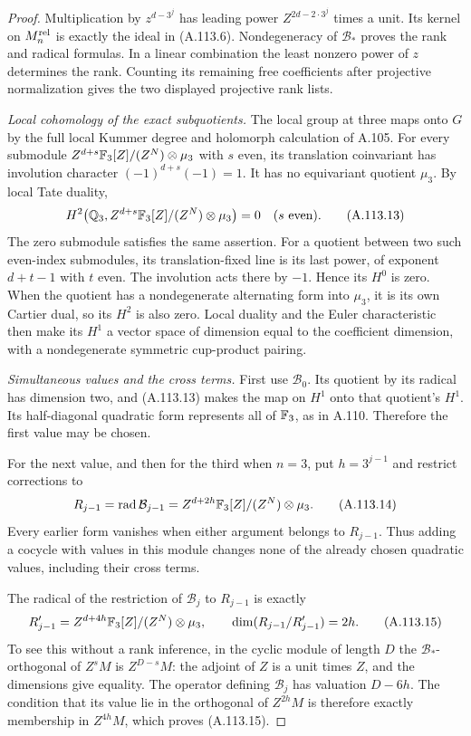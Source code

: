 \begin{proof}
Multiplication by $z^{d-3^j}$ has leading power
$Z^{2d-2\cdot3^j}$ times a unit.
Its kernel on $M_n^{\rm rel}$ is exactly the ideal in
(A.113.6).  Nondegeneracy of $\mathcal B_*$ proves the
rank and radical formulas.  In a linear combination the
least nonzero power of $z$ determines the rank.
Counting its remaining free coefficients after projective
normalization gives the two displayed projective rank lists.

\emph{Local cohomology of the exact subquotients.}
The local group at three maps onto $G$ by the full local
Kummer degree and holomorph calculation of A.105.
For every submodule $Z^{d+s}\mathbb F_3[Z]/(Z^N)\otimes\mu_3$
with $s$ even, its translation coinvariant has involution
character $(-1)^{d+s}(-1)=1$.
It has no equivariant quotient $\mu_3$.
By local Tate duality,
\[
 H^2\bigl(\mathbb Q_3,Z^{d+s}\mathbb F_3[Z]/(Z^N)\otimes\mu_3\bigr)=0
                         \quad(s\text{ even}).
 \tag{A.113.13}
\]
The zero submodule satisfies the same assertion.
For a quotient between two such even-index submodules,
its translation-fixed line is its last power, of exponent
$d+t-1$ with $t$ even.  The involution acts there by $-1$.
Hence its $H^0$ is zero.
When the quotient has a nondegenerate alternating form into
$\mu_3$, it is its own Cartier dual, so its $H^2$ is also zero.
Local duality and the Euler characteristic
\cite[I, Corollary 2.3 and Theorem 2.8]{BIR_MilneADT}
then make its $H^1$ a vector space of dimension equal to the
coefficient dimension, with a nondegenerate symmetric
cup-product pairing.

\emph{Simultaneous values and the cross terms.}
First use $\mathcal B_0$.
Its quotient by its radical has dimension two, and
(A.113.13) makes the map on $H^1$ onto that quotient's
$H^1$.  Its half-diagonal quadratic form represents all of
$\mathbb F_3$, as in A.110.  Therefore the first value may be chosen.

For the next value, and then for the third when $n=3$, put
$h=3^{j-1}$ and restrict corrections to
\[
 R_{j-1}=\operatorname{rad}\mathcal B_{j-1}
            =Z^{d+2h}\mathbb F_3[Z]/(Z^N)\otimes\mu_3.
 \tag{A.113.14}
\]
Every earlier form vanishes when either argument belongs
to $R_{j-1}$.  Thus adding a cocycle with values in this
module changes none of the already chosen quadratic values,
including their cross terms.

The radical of the restriction of $\mathcal B_j$ to
$R_{j-1}$ is exactly
\[
 R'_{j-1}=Z^{d+4h}\mathbb F_3[Z]/(Z^N)\otimes\mu_3,
          \qquad \dim(R_{j-1}/R'_{j-1})=2h.
 \tag{A.113.15}
\]
To see this without a rank inference, in the cyclic module
of length $D$ the $\mathcal B_*$-orthogonal of $Z^sM$
is $Z^{D-s}M$: the adjoint of $Z$ is a unit times $Z$,
and the dimensions give equality.
The operator defining $\mathcal B_j$ has valuation
$D-6h$.  The condition that its value lie in the
orthogonal of $Z^{2h}M$ is therefore exactly membership
in $Z^{4h}M$, which proves (A.113.15).


\end{proof}
